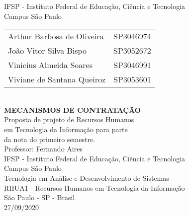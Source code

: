 \thispagestyle{empty}
\begin{center}
{\Large IFSP - Instituto Federal de Educação, Ciência e Tecnologia \\  Campus São Paulo\\}
\vspace{1cm}
{\large
\begin{tabular}{lr}

Arthur Barbosa de Oliveira & SP3046974 \\
João Vitor Silva Bispo & SP3052672 \\
Vinicius Almeida Soares & SP3046991 \\
Viviane de Santana Queiroz & SP3053601 \\

\end{tabular}}
\vspace{2cm}\\
{\Large \bfseries  MECANISMOS DE CONTRATAÇÃO}\\
\vspace{1cm}
\hspace{5.7cm} Proposta de projeto de Recursos Humanos \\
\hspace{5.5cm} em Tecnologia da Informação para parte \\
\hspace{3.5cm} da nota do primeiro semestre.\\
\vspace{2cm}
{\large Professor: Fernando Aires}\\
\vspace{1cm}
IFSP - Instituto Federal de Educação, Ciência e Tecnologia\\
\vspace{.2cm}
Campus São Paulo\\
\vspace{.2cm}
Tecnologia em Análise e Desenvolvimento de Sistemas\\
\vspace{.2cm}
RHUA1 - Recursos Humanos em Tecnologia da Informação\\
\vspace{1cm}
{\large São Paulo - SP - Brasil}\\
\vspace{.2cm}
{\large 27/09/2020}


\end{center}
